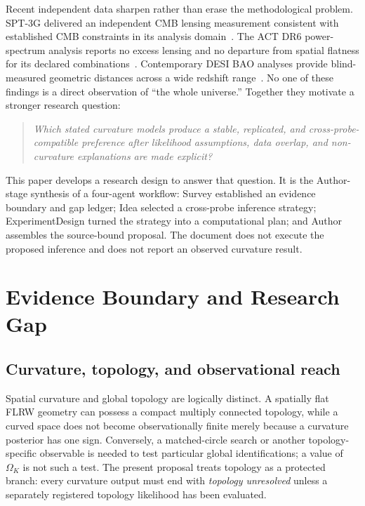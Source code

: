 \documentclass[conference]{IEEEtran}
\newcommand{\ok}{\ensuremath{\Omega_K}}
\begin{document}
Recent independent data sharpen rather than erase the methodological problem. SPT-3G delivered an independent CMB lensing measurement consistent with established CMB constraints in its analysis domain~\cite{spt23}. The ACT DR6 power-spectrum analysis reports no excess lensing and no departure from spatial flatness for its declared combinations~\cite{act25}. Contemporary DESI BAO analyses provide blind-measured geometric distances across a wide redshift range~\cite{desi25}. No one of these findings is a direct observation of ``the whole universe.'' Together they motivate a stronger research question:

\begin{quote}
\emph{Which stated curvature models produce a stable, replicated, and cross-probe-compatible preference after likelihood assumptions, data overlap, and non-curvature explanations are made explicit?}
\end{quote}

This paper develops a research design to answer that question. It is the Author-stage synthesis of a four-agent workflow: Survey established an evidence boundary and gap ledger; Idea selected a cross-probe inference strategy; ExperimentDesign turned the strategy into a computational plan; and Author assembles the source-bound proposal. The document does not execute the proposed inference and does not report an observed curvature result.

\section{Evidence Boundary and Research Gap}

\subsection{Curvature, topology, and observational reach}

Spatial curvature and global topology are logically distinct. A spatially flat FLRW geometry can possess a compact multiply connected topology, while a curved space does not become observationally finite merely because a curvature posterior has one sign. Conversely, a matched-circle search or another topology-specific observable is needed to test particular global identifications; a value of $\ok$ is not such a test. The present proposal treats topology as a protected branch: every curvature output must end with \emph{topology unresolved} unless a separately registered topology likelihood has been evaluated.
\end{document}

